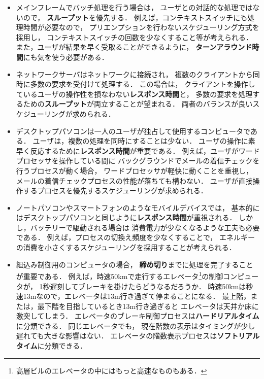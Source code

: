 \begin{itemize}
\item メインフレームでバッチ処理を行う場合は，
ユーザとの対話的な処理ではないので，
{\bf スループット}を優先する．
例えば，コンテキストスイッチにも処理時間が必要なので，
プリエンプションを行わないスケジューリング方式を採用し，
コンテキストスイッチの回数を少なくすること等が考えられる．
また，ユーザが結果を早く受取ることができるように，
{\bf ターンアラウンド時間}にも気を使う必要がある．

\item ネットワークサーバはネットワークに接続され，
複数のクライアントから同時に多数の要求を受付けて処理する．
この場合は，
クライアントを操作しているユーザの操作性を損なわない{\bf レスポンス時間}と，
多数の要求を処理するための{\bf スループット}が両立することが望まれる．
両者のバランスが良いスケジューリングが求められる．

\item デスクトップパソコンは一人のユーザが独占して使用するコンピュータである．
ユーザは，複数の処理を同時にすることは少ない．
ユーザの操作に素早く反応するために{\bf レスポンス時間}が重要である．
例えば，ユーザがワードプロセッサを操作している間に
バックグラウンドでメールの着信チェックを行うプロセスが動く場合，
ワードプロセッサが軽快に動くことを重視し，
メールの着信チェックプロセスの性能が落ちても構わない．
ユーザが直接操作するプロセスを優先するスケジューリングが求められる．

\item ノートパソコンやスマートフォンのようなモバイルデバイスでは，
基本的にはデスクトップパソコンと同じように{\bf レスポンス時間}が重視される．
しかし，バッテリーで駆動される場合は
消費電力が少なくなるような工夫も必要である．
例えば，プロセスの切換え頻度を少なくすることで，
エネルギーの消費を小さくするスケジューリングを採用することが考えられる．

\item 組込み制御用のコンピュータの場合，
{\bf 締め切り}までに処理を完了することが重要である．
例えば，時速50kmで走行するエレベータ\footnote{
高層ビルのエレベータの中にはもっと高速なものもある．
}の制御コンピュータが，
1秒遅刻してブレーキを掛けたらどうなるだろうか．
時速50kmは秒速13mなので，エレベータは13m行き過ぎて停まることになる．
最上階，または，最下階を目指しているとき13m行き過ぎると
エレベータは天井か床に激突してしまう．
エレベータのブレーキ制御プロセスは{\bf ハードリアルタイム}に分類できる．
同じエレベータでも，
現在階数の表示はタイミングが少し遅れても大きな影響はない．
エレベータの階数表示プロセスは{\bf ソフトリアルタイム}に分類できる．
\end{itemize}


